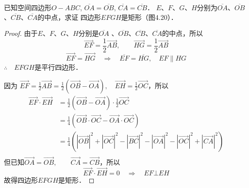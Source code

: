 \begin{figure}[htp]\centering
    \begin{minipage}[t]{0.48\textwidth}
    \centering
{}
    \caption{}
    \end{minipage}
    \begin{minipage}[t]{0.48\textwidth}
    \centering
    \caption{}
    \end{minipage}
    \end{figure}

\begin{example}
    已知空间四边形$O-ABC$, $\overline{OA}=\overline{OB}$, $\overline{CA}=\overline{CB}$．
    $E$、$F$、$G$、$H$分别为$\overline{OA}$、$\overline{OB}$、$\overline{CB}$、$\overline{CA}$的中点，求证
    四边形$EFGH$是矩形（图4.20）．
\end{example}

\begin{proof}
由于$E$、$F$、$G$、$H$分别是$\overline{OA}$
、$\overline{OB}$、$\overline{CB}$、$\overline{CA}$的中点，所以
\[\Vec{EF}=\frac{1}{2}\Vec{AB},\qquad \Vec{HG}=\frac{1}{2}\Vec{AB}\]
\[\Vec{EF}=\Vec{HG}\quad \Rightarrow\quad \overline{EF}=\overline{HG},\quad EF\parallel HG\]
$\therefore\quad EFGH$是平行四边形．

因为
$\Vec{EF}=\frac{1}{2}\Vec{AB}=\frac{1}{2}(\Vec{OB}-\Vec{OA}),\quad \Vec{EH}=\frac{1}{2}\Vec{OC}$，所以
\[\begin{split}
        \Vec{E F} \cdot \Vec{E H} &=\frac{1}{2}(\Vec{O B}-\Vec{O A}) \cdot \frac{1}{2} \Vec{O C} \\
        &=\frac{1}{4}(\Vec{O B} \cdot \Vec{O C}-\Vec{O A} \cdot \Vec{O C}) \\
        &=\frac{1}{4}\left(|\Vec{O B}|^{2}+|\Vec{O C}|^{2}-|\Vec{B C}|^{2}-|\Vec{O A}|^{2}-|\Vec{O C}|^{2}+|\Vec{C A}|^{2}\right) \\
\end{split}\]
但已知$\Vec{O A}=\Vec{O B},\qquad \Vec{C A}=\Vec{C B}$，所以
\[\Vec{E F} \cdot \Vec{E H} =0 \quad \Rightarrow\quad  E F \bot E H\]
故得四边形$EFGH$是矩形．
\end{proof}

